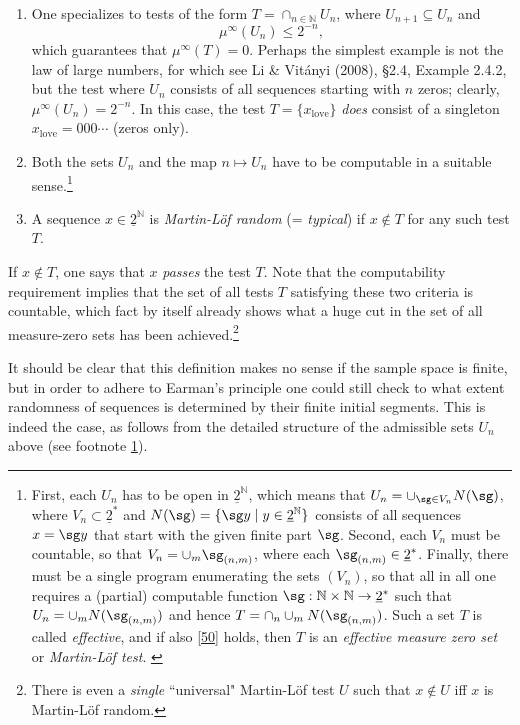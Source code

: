 \documentclass[12pt]{article}
\numberwithin{equation}{section}
\newcommand{\er}{\eqref}
\newcommand{\beq}{\begin{equation}}
\newcommand{\eeq}{\end{equation}}
\newcommand{\ul}{\underline}
\newcommand{\raw}{\rightarrow}
\newcommand{\x}{\times}
\newcommand{\N}{{\mathbb N}} \newcommand{\R}{{\mathbb R}}
\begin{document}
 \begin{enumerate}
\item 
 One specializes to tests of the form $T=\cap_{n\in\N} U_n$, where $U_{n+1}\subseteq U_n$ and 
 \beq
 \mu^{\infty}(U_n)\leq 2^{-n}, \label{50}
 \eeq 
 which guarantees that $\mu^{\infty}(T)=0$. 
Perhaps the simplest example is not the law of large numbers, for which see Li \& Vit\'{a}nyi (2008), \S 2.4, Example 2.4.2, but the test where $U_n$ consists of all sequences starting with $n$ zeros; clearly, $ \mu^{\infty}(U_n)= 2^{-n}$. In this case, the  test $T=\{x_{\mathrm{love}}\}$ \emph{does} consist of a singleton $x_{\mathrm{love}}=000\cdots$ (zeros only).
\item Both the sets $U_n$ and the map $n\mapsto U_n$ have to be computable in a suitable sense.\footnote{\label{Un}First, each $U_n$ has to be open in $\ul{2}^{\N}$, which means that  $U_n=\cup_{\sg\in V_n} N(\sg)$, where $V_n\subset \ul{2}^*$
and $N(\sg)=\{\sg y\mid y\in \ul{2}^{\N}\}$ consists of all sequences $x=\sg y$ that start with the given finite part $\sg$. Second, 
each $V_n$ must be countable, so that $V_n=\cup_m \sg_{(n,m)}$, where each $\sg_{(n,m)}\in \ul{2}^*$. Finally, 
there must be a single program enumerating the sets $(V_n)$, so that all in all one requires a (partial) computable function $\sg:\N\x\N\raw \ul{2}^*$ such that $U_n=\cup_m N(\sg_{(n,m)})$ and hence $T=\cap_n\cup_m N(\sg_{(n,m)})$. Such a set $T$ is called \emph{effective}, and if also \er{50} holds, then $T$ is an \emph{effective measure zero set} or \emph{Martin-L\"{o}f test}.  \label{effective}
}
\item A sequence $x\in \ul{2}^{\N}$ is  \emph{Martin-L\"{o}f random} (= \emph{typical})  if $x\notin T$ for any such test $T$.
\end{enumerate}
If $x\notin T$, one says that $x$ \emph{passes} the test $T$. Note that the computability requirement  implies that  the set of all tests $T$ satisfying these two criteria is countable, which fact by itself already shows what a huge cut in the set of all measure-zero sets has been achieved.\footnote{There is even a \emph{single} ``universal" Martin-L\"{o}f test $U$ such that $x\notin U$ iff $x$ is Martin-L\"{o}f random.}

It should be clear that this definition makes no sense if the sample space is finite, but in order to adhere to Earman's principle one could still check to what extent randomness of sequences is determined by their finite initial segments. This is indeed the case, as follows from the detailed structure of the admissible sets $U_n$ above (see footnote \ref{Un}).
\end{document}
